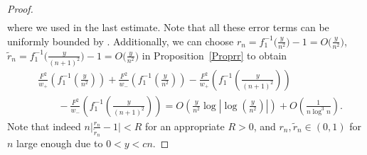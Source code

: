 \documentclass[11pt]{article}
\numberwithin{equation}{section}
\numberwithin{equation}{section}
\begin{document}
\begin{proof}
\begin{align*}
\end{align*}
where we used \cite[Lemma~6.4]{KMVV} in the last estimate. Note that all these error terms can be uniformly bounded by . Additionally, we can choose $r_n = f_1^{-1}\big(\frac{y}{n^2}\big)-1 = O\big( \frac{y}{n^2}\big)$, $\tilde r_n = f_1^{-1}\big(\frac{y}{(n+1)^2}\big)-1 = O\big( \frac{y}{n^2}\big)$ in Proposition~\ref{Proprr} to obtain
\begin{align*}
 &\frac{F^2}{w_+}\left(f_1^{-1}\left(\frac{y}{n^2}\right)\right)+\frac{F^2}{w_-}\left(f_1^{-1}\left(\frac{y}{n^2}\right)\right) - \frac{F^2}{w_+}\left(f_1^{-1}\left(\frac{y}{(n+1)^2}\right)\right)
 \\
 &\qquad{}-\frac{F^2}{w_-}\left(f_1^{-1}\left(\frac{y}{(n+1)^2}\right)\right) = O\left(\frac{y}{n^2}\log \left| \log \left( \frac{y}{n^2} \right)\right| \right)+O\left(\frac{1}{n\log^3 n}\right).
\end{align*}
Note that indeed $n \big|\frac{r_n}{\tilde r_n} - 1\big| < R$ for an appropriate $R > 0$, and $r_n, \tilde r_n \in (0,1)$ for $n$ large enough due to $0 < y < cn$.


\end{proof}
\end{document}
